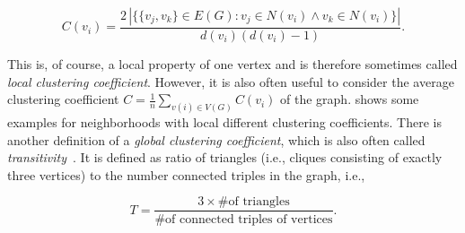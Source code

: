 \begin{equation}
 C(v_i) = \frac{2 \, |\{ \{v_j, v_k \} \in E(G) : v_j \in N(v_i) \wedge v_k \in N(v_i) \}| }{d(v_i)(d(v_i) - 1)}.
\end{equation}

This is, of course, a local property of one vertex and is therefore sometimes called \emph{local clustering coefficient}.
However, it is also often useful to consider the average clustering coefficient \( C = \frac{1}{n} \sum_{v(i) \in V(G)} C(v_i) \) of the graph.
 shows some examples for neighborhoods with local different clustering coefficients.
There is another definition of a \emph{global clustering coefficient}, which is also often called \emph{transitivity}~\cite{Boccaletti2006}.
It is defined as ratio of triangles (i.e., cliques consisting of exactly three vertices) to the number connected triples in the graph, i.e.,

\begin{equation}
 T = \frac{3 \times \text{\# of triangles}}{\text{\# of connected triples of vertices}}.
\end{equation}


